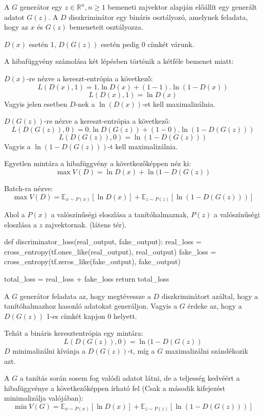 
A $G$ generátor egy $z \in \mathbb{R}^n, n \geq 1$ bemeneti zajvektor alapján előállít egy generált adatot $G(z)$.
A $D$ diszkriminátor egy bináris osztályozó, amelynek feladata, hogy az $x$ és $G(z)$ bemeneteit osztályozza.

$D(x)$ esetén 1, $D(G(z))$ esetén pedig 0 címkét várunk.

A hibafüggvény számolása két lépésben történik a kétféle bemenet miatt:

$D(x)$-re nézve a kereszt-entrópia a következő:
$$L(D(x), 1) = 1.\ln D(x) + (1 - 1).\ln(1 - D(x))$$
$$L(D(x), 1) = \ln D(x)$$
Vagyis jelen esetben $D$-nek a $\ln(D(x))$-et kell maximalizálnia.

$D(G(z))$-re nézve a kereszt-entrópia a következő:
$$L(D(G(z)), 0) = 0.\ln D(G(z)) + (1 - 0).\ln(1 - D(G(z)))$$
$$L(D(G(z)), 0) = \ln(1- D(G(z)))$$
Vagyis a $\ln(1 - D(G(z)))$-t kell maximalizálnia.

Egyetlen mintára a hibafüggvény a következőképpen néz ki:
$$\max V(D) = \ln D(x) + \ln(1 - D(G(z))$$

Batch-ra nézve:
$$\max V(D) = \mathbb{E}_{x \sim P(x)} \left[\ln D(x) \right] + \mathbb{E}_{z \sim P(z)} \left[\ln(1 - D(G(z))) \right]$$

Ahol a $P(x)$ a valószínűségi eloszlása a tanítóhalmaznak, $P(z)$ a valószínűségi eloszlása a $z$ zajvektornak. (látens tér).

\begin{python}
def discriminator_loss(real_output, fake_output):
    real_loss = cross_entropy(tf.ones_like(real_output), real_output)
    fake_loss = cross_entropy(tf.zeros_like(fake_output), fake_output)
    
    total_loss = real_loss + fake_loss
    return total_loss
\end{python}



A $G$ generátor feladata az, hogy megtévessze a $D$ diszkriminátort azáltal, hogy a tanítóhalmazhoz hasonló adatokat generáljon.
Vagyis a $G$ érdeke az, hogy a $D(G(z))$ 1-es címkét kapjon 0 helyett.

Tehát a bináris keresztentrópia egy mintára:
$$L(D(G(z)), 0) = \ln(1 - D(G(z))$$
$D$ minimalizálni kívánja a $D(G(z))$-t, míg a $G$ maximalizálni szándékozik azt.

A $G$ a tanítás során sosem fog valódi adatot látni, de a teljesség kedvéért a hibafüggvénye a következőképpen írható fel (Csak a második kifejezést minimalizálja valójában):
$$\min V(G) = \mathbb{E}_{x \sim P(x)} \left[\ln D(x) \right] + \mathbb{E}_{z \sim P(z)} \left[\ln(1 - D(G(z))) \right]$$

